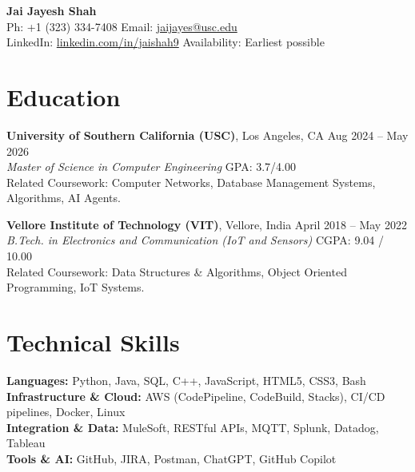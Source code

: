 \documentclass[letterpaper,10pt]{article}
\begin{document}
\begin{center}
    {\LARGE \textbf{Jai Jayesh Shah}} \\
    \vspace{5pt}
    \small
    Ph: +1 (323) 334-7408 \quad Email: \href{mailto:jaijayes@usc.edu}{jaijayes@usc.edu} \\
    LinkedIn: \href{https://www.linkedin.com/in/jaishah9}{linkedin.com/in/jaishah9} \quad Availability: Earliest possible \\
    \vspace{-8pt}
\end{center}

\section*{Education}
\textbf{University of Southern California (USC)}, Los Angeles, CA \hfill Aug 2024 -- May 2026 \\
\textit{Master of Science in Computer Engineering} \hfill GPA: 3.7/4.00 \\
Related Coursework: Computer Networks, Database Management Systems, Algorithms, AI Agents.

\vspace{1pt}

\textbf{Vellore Institute of Technology (VIT)}, Vellore, India \hfill April 2018 -- May 2022 \\
\textit{B.Tech. in Electronics and Communication (IoT and Sensors)} \hfill CGPA: 9.04 / 10.00 \\
Related Coursework: Data Structures \& Algorithms, Object Oriented Programming, IoT Systems.

\section*{Technical Skills}
\textbf{Languages:} Python, Java, SQL, C++, JavaScript, HTML5, CSS3, Bash \\
\textbf{Infrastructure \& Cloud:} AWS (CodePipeline, CodeBuild, Stacks), CI/CD pipelines, Docker, Linux \\
\textbf{Integration \& Data:} MuleSoft, RESTful APIs, MQTT, Splunk, Datadog, Tableau \\
\textbf{Tools \& AI:} GitHub, JIRA, Postman, ChatGPT, GitHub Copilot

\end{document}
